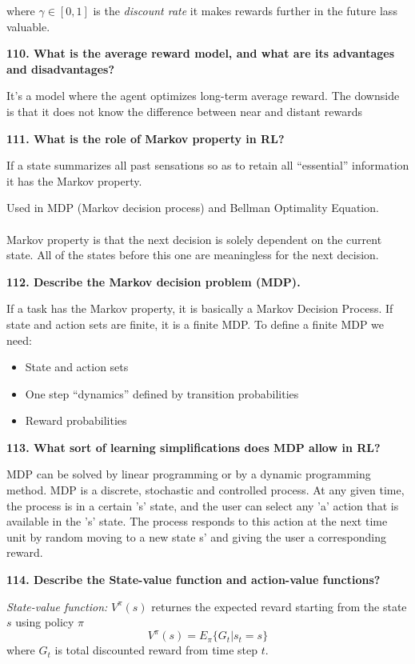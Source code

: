 where $\gamma \in [0,1]$ is the \textit{discount rate} it makes rewards 
further in the future lass valuable.

\textbf{110. What is the average reward model, and what are its
advantages and disadvantages?}

It's a model where the agent optimizes long-term average reward. The
downside is that it does not know the difference between near and
distant rewards

\textbf{111. What is the role of Markov property in RL?}

If a state summarizes all past sensations so as to retain all
``essential'' information it has the Markov property.

Used in MDP (Markov decision process) and Bellman Optimality Equation.\\
~\\
Markov property is that the next decision is solely dependent on the
current state. All of the states before this one are meaningless for the
next decision.

\textbf{112. Describe the Markov decision problem (MDP).}

If a task has the Markov property, it is basically a Markov Decision
Process. If state and action sets are finite, it is a finite MDP. To
define a finite MDP we need:

\begin{itemize}
\item State and action sets
\item One step ``dynamics'' defined by transition probabilities
\item Reward probabilities
\end{itemize}

\textbf{113. What sort of learning simplifications does MDP allow in
RL?}

MDP can be solved by linear programming or by a dynamic programming
method. MDP is a discrete, stochastic and controlled process. At any
given time, the process is in a certain 's' state, and the user can
select any 'a' action that is available in the 's' state. The process
responds to this action at the next time unit by random moving to a new
state s' and giving the user a corresponding reward.

\textbf{114. Describe the State-value function and action-value
functions?}

\textit{State-value function:} $V^\pi(s)$ returnes the expected
revard starting from the state $s$ using policy $\pi$
\[ V^\pi (s) = E_\pi \{ G_t | s_t = s \}\]
where $G_t$ is total discounted reward from time step $t$.

